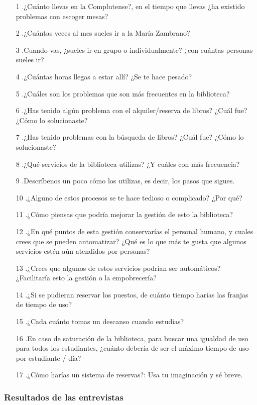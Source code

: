 \documentclass[12pt]{article}
\begin{document}
\begin{itemize}
\item[1].¿Cuánto llevas en la Complutense?, en el tiempo que llevas ¿ha existido problemas con escoger mesas? 
\item[2].¿Cuántas veces al mes sueles ir a la María Zambrano? 
\item[3].Cuando vas, ¿sueles ir en grupo o individualmente? ¿con cuántas personas sueles ir? 
\item[4].¿Cuántas horas llegas a estar allí? ¿Se te hace pesado? 
\item[5].¿Cuáles son los problemas que son más frecuentes en la biblioteca? 
\item[6].¿Has tenido algún problema con el alquiler/reserva de libros? ¿Cuál fue? ¿Cómo lo solucionaste? 
\item[7].¿Has tenido problemas con la búsqueda de libros? ¿Cuál fue? ¿Cómo lo solucionaste? 
\item[8].¿Qué servicios de la biblioteca utilizas? ¿Y cuáles con más frecuencia? 
\item[9].Descríbenos un poco cómo los utilizas, es decir, los pasos que sigues. 
\item[10].¿Alguno de estos procesos se te hace tedioso o complicado? ¿Por qué? 
\item[11].¿Cómo piensas que podría mejorar la gestión de esto la biblioteca? 
\item[12].¿En qué puntos de esta gestión conservarías el personal humano, y cuales crees que se pueden automatizar? ¿Qué es lo que más te gusta que algunos servicios estén aún atendidos por personas? 
\item[13].¿Crees que algunos de estos servicios podrían ser automáticos? ¿Facilitaría esto la gestión o la empobrecería? 
\item[14].¿Si se pudieran reservar los puestos, de cuánto tiempo harías las franjas de tiempo de uso?
\item[15].¿Cada cuánto tomas un descanso cuando estudias? 
\item[16].En caso de saturación de la biblioteca, para buscar una igualdad de uso para todos los estudiantes, ¿cuánto debería de ser el máximo tiempo de uso por estudiante / día?
\item[17].¿Cómo harías un sistema de reservas?: Usa tu imaginación y sé breve.
\end{itemize}

\subsubsection{Resultados de las entrevistas}
\end{document}

